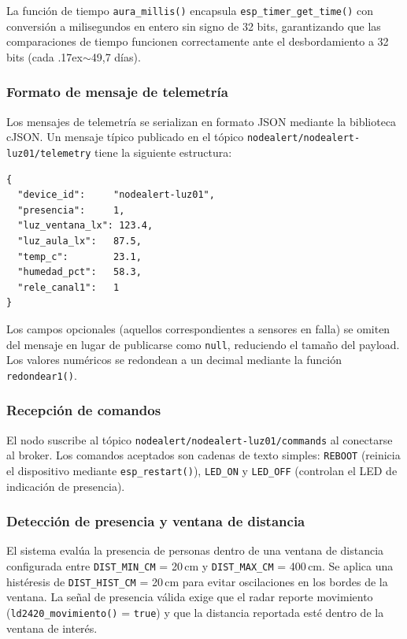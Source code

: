 La función de tiempo \texttt{aura\_millis()} encapsula \texttt{esp\_timer\_get\_time()}
con conversión a milisegundos en entero sin signo de 32 bits, garantizando que las
comparaciones de tiempo funcionen correctamente ante el desbordamiento a 32 bits
(cada \raise.17ex\hbox{$\scriptstyle\mathtt{\sim}$}49,7 días).

\subsubsection{Formato de mensaje de telemetría}

Los mensajes de telemetría se serializan en formato JSON mediante la biblioteca
cJSON. Un mensaje típico publicado en el tópico
\texttt{nodealert/nodealert-luz01/telemetry} tiene la siguiente estructura:

\begin{lstlisting}[caption={Ejemplo de mensaje JSON de telemetría.}, label={lst:json_tele}]
{
  "device_id":     "nodealert-luz01",
  "presencia":     1,
  "luz_ventana_lx": 123.4,
  "luz_aula_lx":   87.5,
  "temp_c":        23.1,
  "humedad_pct":   58.3,
  "rele_canal1":   1
}
\end{lstlisting}

Los campos opcionales (aquellos correspondientes a sensores en falla) se omiten del
mensaje en lugar de publicarse como \texttt{null}, reduciendo el tamaño del payload.
Los valores numéricos se redondean a un decimal mediante la función
\texttt{redondear1()}.

\subsubsection{Recepción de comandos}

El nodo suscribe al tópico \texttt{nodealert/nodealert-luz01/commands} al conectarse
al broker. Los comandos aceptados son cadenas de texto simples:
\texttt{REBOOT} (reinicia el dispositivo mediante \texttt{esp\_restart()}),
\texttt{LED\_ON} y \texttt{LED\_OFF} (controlan el LED de indicación de presencia).

\subsubsection{Detección de presencia y ventana de distancia}

El sistema evalúa la presencia de personas dentro de una ventana de distancia
configurada entre \texttt{DIST\_MIN\_CM} = 20\,cm y \texttt{DIST\_MAX\_CM} = 400\,cm.
Se aplica una histéresis de \texttt{DIST\_HIST\_CM} = 20\,cm para evitar
oscilaciones en los bordes de la ventana. La señal de presencia válida exige que el
radar reporte movimiento (\texttt{ld2420\_movimiento()} = \texttt{true}) y que la
distancia reportada esté dentro de la ventana de interés.


